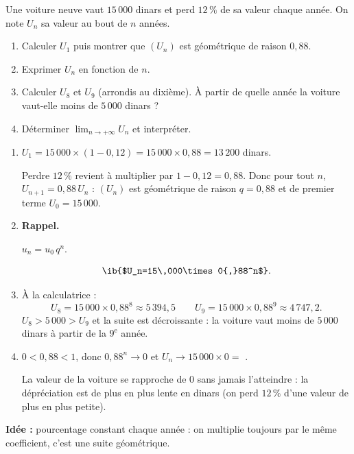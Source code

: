 
Une voiture neuve vaut $15\,000$ dinars et perd $12\,\%$ de sa valeur chaque année. On note $U_n$ sa valeur au bout de $n$ années.

\begin{enumerate}
  \item Calculer $U_1$ puis montrer que $(U_n)$ est géométrique de raison $0{,}88$.
  \item Exprimer $U_n$ en fonction de $n$.
  \item Calculer $U_8$ et $U_9$ (arrondis au dixième). À partir de quelle année la voiture vaut-elle moins de $5\,000$ dinars ?
  \item Déterminer $\displaystyle\lim_{n\to+\infty}U_n$ et interpréter.
\end{enumerate}

\begin{enumerate}
  \item $U_1=15\,000\times(1-0{,}12)=15\,000\times0{,}88=13\,200$ dinars.

  Perdre $12\,\%$ revient à multiplier par $1-0{,}12=0{,}88$. Donc pour tout $n$, $U_{n+1}=0{,}88\,U_n$ : $(U_n)$ est géométrique de raison $q=0{,}88$ et de premier terme $U_0=15\,000$.
  \item \textbf{Rappel.}\par
  \begin{prop}
  $u_n=u_0\,q^n$.
  \end{prop}
  $$ \ib{$U_n=15\,000\times0{,}88^n$}.$$
  \item À la calculatrice :
  $$U_8=15\,000\times0{,}88^8\approx5\,394{,}5\qquad U_9=15\,000\times0{,}88^9\approx4\,747{,}2.$$
  $U_8>5\,000>U_9$ et la suite est décroissante : la voiture vaut moins de $5\,000$ dinars à partir de la $9^{\text{e}}$ année.
  \item $0<0{,}88<1$, donc $0{,}88^n\to0$ et $U_n\to15\,000\times0=$ .

  La valeur de la voiture se rapproche de $0$ sans jamais l'atteindre : la dépréciation est de plus en plus lente en dinars (on perd $12\,\%$ d'une valeur de plus en plus petite).
\end{enumerate}

\textbf{Idée :} pourcentage constant chaque année : on multiplie toujours par le même coefficient, c'est une suite géométrique.
